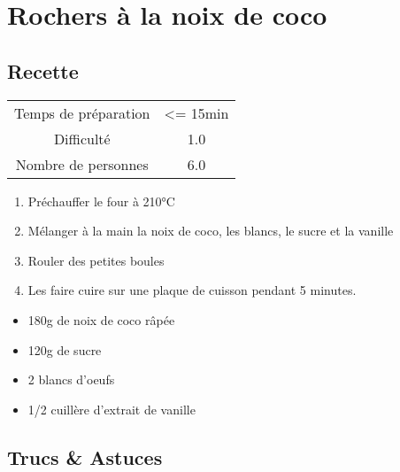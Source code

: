 \newpage
\section{Rochers à la noix de coco}
    \label{sec:Rochers à la noix de coco}
    \subsection{Recette}
    \vspace{1cm}


    \begin{center}
        \begin{tabular}{c|c}
            Temps de préparation & <= 15min \\
            Difficulté & 1.0 \\
            Nombre de personnes & 6.0 
        \end{tabular}
    \end{center}{}

    \vspace{1cm}
    \hline
    \vspace{1cm}

    \begin{minipage}{.7\textwidth}
        \begin{enumerate}
            \item Préchauffer le four à 210°C
	    \item Mélanger à la main la noix de coco, les blancs, le sucre et la vanille
	    \item Rouler des petites boules
	    \item Les faire cuire sur une plaque de cuisson pendant 5 minutes.

        \end{enumerate}
    \end{minipage}
    \begin{minipage}{.3\textwidth}
        \begin{flushleft}
        \begin{itemize}
            \item 180g de noix de coco râpée
	    \item 120g de sucre
	    \item 2 blancs d'oeufs
	    \item 1/2 cuillère d'extrait de vanille

        \end{itemize}
        \end{flushleft}
    \end{minipage}
    
    \vspace{1cm}
    \hline
    \vspace{1cm}
    
    \subsection{Trucs \& Astuces}
        
